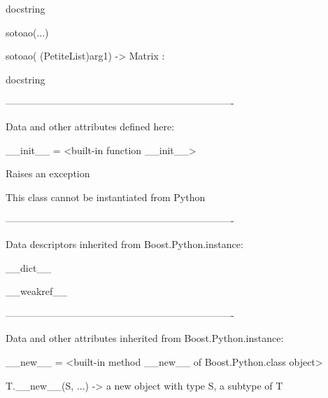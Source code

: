 \documentclass[letterpaper,10pt,english]{sphinxmanual}
\begin{document}
\begin{description}
\begin{description}
\begin{DUlineblock}{0em}
\begin{DUlineblock}{\DUlineblockindent}
\item[]
\begin{DUlineblock}{\DUlineblockindent}
\item[] docstring
\item[] 
\end{DUlineblock}
\end{DUlineblock}
\item[] sotoao(...)
\item[]
\begin{DUlineblock}{\DUlineblockindent}
\item[] sotoao( (PetiteList)arg1) -\textgreater{} Matrix :
\item[]
\begin{DUlineblock}{\DUlineblockindent}
\item[] docstring
\item[] 
\end{DUlineblock}
\end{DUlineblock}
\item[] ----------------------------------------------------------------------
\item[] Data and other attributes defined here:
\item[] 
\item[] \_\_init\_\_ = \textless{}built-in function \_\_init\_\_\textgreater{}
\item[]
\begin{DUlineblock}{\DUlineblockindent}
\item[] Raises an exception
\item[] This class cannot be instantiated from Python
\item[] 
\end{DUlineblock}
\item[] ----------------------------------------------------------------------
\item[] Data descriptors inherited from Boost.Python.instance:
\item[] 
\item[] \_\_dict\_\_
\item[] 
\item[] \_\_weakref\_\_
\item[] 
\item[] ----------------------------------------------------------------------
\item[] Data and other attributes inherited from Boost.Python.instance:
\item[] 
\item[] \_\_new\_\_ = \textless{}built-in method \_\_new\_\_ of Boost.Python.class object\textgreater{}
\item[]
\begin{DUlineblock}{\DUlineblockindent}
\item[] T.\_\_new\_\_(S, ...) -\textgreater{} a new object with type S, a subtype of T
\end{DUlineblock}
\end{DUlineblock}


\end{description}
\end{description}
\end{document}
